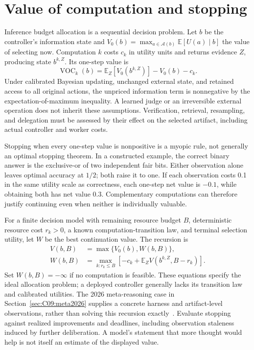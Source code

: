 \section{Value of computation and stopping}
\label{sec:C09:value}
Inference budget allocation is a sequential decision problem. Let $b$ be the controller's information state and $V_0(b)=\max_{a\in\mathcal A(b)}\mathbb E[U(a)\mid b]$ the value of selecting now. Computation $k$ costs $c_k$ in utility units and returns evidence $Z$, producing state $b^{k,Z}$. Its one-step value is
\begin{equation}
 \operatorname{VOC}_k(b)=
 \mathbb E_Z[V_0(b^{k,Z})]-V_0(b)-c_k.
\end{equation}
Under calibrated Bayesian updating, unchanged external state, and retained access to all original actions, the unpriced information term is nonnegative by the expectation-of-maximum inequality. A learned judge or an irreversible external operation does not inherit these assumptions. Verification, retrieval, resampling, and delegation must be assessed by their effect on the selected artifact, including actual controller and worker costs.

Stopping when every one-step value is nonpositive is a myopic rule, not generally an optimal stopping theorem. In a constructed example, the correct binary answer is the exclusive-or of two independent fair bits. Either observation alone leaves optimal accuracy at $1/2$; both raise it to one. If each observation costs 0.1 in the same utility scale as correctness, each one-step net value is $-0.1$, while obtaining both has net value $0.3$. Complementary computations can therefore justify continuing even when neither is individually valuable.

For a finite decision model with remaining resource budget $B$, deterministic resource cost $r_k>0$, a known computation-transition law, and terminal selection utility, let $W$ be the best continuation value. The recursion is
\begin{align}
 V(b,B)&=\max\{V_0(b),W(b,B)\},\\
 W(b,B)&=\max_{k:r_k\leq B}
 \left[-c_k+\mathbb E_Z V(b^{k,Z},B-r_k)\right].
\end{align}
Set $W(b,B)=-\infty$ if no computation is feasible. These equations specify the ideal allocation problem; a deployed controller generally lacks its transition law and calibrated utilities. The 2026 meta-reasoning case in Section~\ref{sec:C09:meta2026} supplies a concrete harness and artifact-level observations, rather than solving this recursion exactly~\cite{rewrite_metareasoning2026}. Evaluate stopping against realized improvements and deadlines, including observation staleness induced by further deliberation. A model's statement that more thought would help is not itself an estimate of the displayed value.

